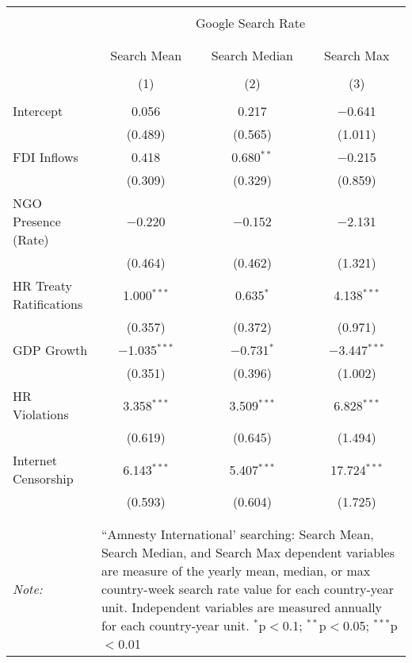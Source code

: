 
\begin{table}[!htbp] \centering 
  \caption{} 
  \label{} 
\begin{tabular}{@{\extracolsep{5pt}}lccc} 
\\[-1.8ex]\hline 
\hline \\[-1.8ex] 
 & \multicolumn{3}{c}{Google Search Rate} \\ 
\cline{2-4} 
\\[-1.8ex] & \multicolumn{3}{c}{ } \\ 
 & Search Mean & Search Median & Search Max \\ 
\\[-1.8ex] & (1) & (2) & (3)\\ 
\hline \\[-1.8ex] 
 Intercept & 0.056 & 0.217 & $-$0.641 \\ 
  & (0.489) & (0.565) & (1.011) \\ 
  FDI Inflows & 0.418 & 0.680$^{**}$ & $-$0.215 \\ 
  & (0.309) & (0.329) & (0.859) \\ 
  NGO Presence (Rate) & $-$0.220 & $-$0.152 & $-$2.131 \\ 
  & (0.464) & (0.462) & (1.321) \\ 
  HR Treaty Ratifications & 1.000$^{***}$ & 0.635$^{*}$ & 4.138$^{***}$ \\ 
  & (0.357) & (0.372) & (0.971) \\ 
  GDP Growth & $-$1.035$^{***}$ & $-$0.731$^{*}$ & $-$3.447$^{***}$ \\ 
  & (0.351) & (0.396) & (1.002) \\ 
  HR Violations & 3.358$^{***}$ & 3.509$^{***}$ & 6.828$^{***}$ \\ 
  & (0.619) & (0.645) & (1.494) \\ 
  Internet Censorship & 6.143$^{***}$ & 5.407$^{***}$ & 17.724$^{***}$ \\ 
  & (0.593) & (0.604) & (1.725) \\ 
 \hline \\[-1.8ex] 
\hline 
\hline \\[-1.8ex] 
\textit{Note:}  & \multicolumn{3}{l}{\parbox[t]{8cm}{``Amnesty International' searching: Search Mean, Search Median, and Search Max dependent variables are measure of the yearly mean, median, or max country-week search rate value for each country-year unit. Independent variables are measured annually for each country-year unit. $^{*}$p$<$0.1; $^{**}$p$<$0.05; $^{***}$p$<$0.01}} \\ 
\end{tabular} 
\end{table} 
